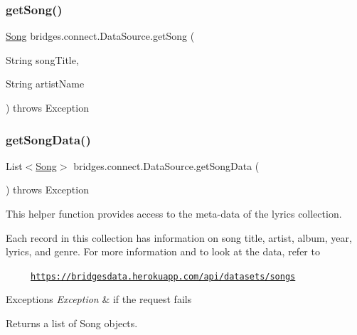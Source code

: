 \subsubsection{\texorpdfstring{get\+Song()}{getSong()}\hspace{0.1cm}{\footnotesize\ttfamily [2/2]}}
{\footnotesize\ttfamily \hyperlink{classbridges_1_1data__src__dependent_1_1_song}{Song} bridges.\+connect.\+Data\+Source.\+get\+Song (\begin{DoxyParamCaption}\item[{String}]{song\+Title,  }\item[{String}]{artist\+Name }\end{DoxyParamCaption}) throws Exception}

\mbox{\label{classbridges_1_1connect_1_1_data_source_ad4e2f30df95e8ce5976d0447c480522e}} 
\subsubsection{\texorpdfstring{get\+Song\+Data()}{getSongData()}}
{\footnotesize\ttfamily List$<$\hyperlink{classbridges_1_1data__src__dependent_1_1_song}{Song}$>$ bridges.\+connect.\+Data\+Source.\+get\+Song\+Data (\begin{DoxyParamCaption}{ }\end{DoxyParamCaption}) throws Exception}

This helper function provides access to the meta-\/data of the lyrics collection.

Each record in this collection has information on song title, artist, album, year, lyrics, and genre. For more information and to look at the data, refer to 

~~~~~\href{https://bridgesdata.herokuapp.com/api/datasets/songs}{\tt https\+://bridgesdata.\+herokuapp.\+com/api/datasets/songs} 


\begin{DoxyExceptions}{Exceptions}
{\em Exception} & if the request fails\\
\hline
\end{DoxyExceptions}
\begin{DoxyReturn}{Returns}
a list of Song objects. 
\end{DoxyReturn}
\mbox{\label{classbridges_1_1connect_1_1_data_source_ad06946cc793bb990eeb3b9418ade1479}} 
